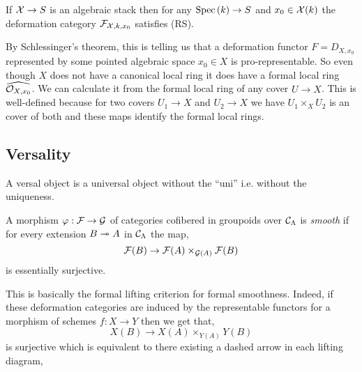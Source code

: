 \documentclass[12pt]{article}
\begin{document}
\begin{lemma}
If $\mathcal{X} \to S$ is an algebraic stack then for any $\mathrm{Spec}\left( k \right) \to S$ and $x_0 \in \mathcal{X}(k)$ the deformation category $\mathcal{F}_{\mathcal{X}, k, x_0}$ satisfies (RS). 
\end{lemma}

\begin{rmk}
By Schlessinger's theorem, this is telling us that a deformation functor $F = D_{X,x_0}$ represented by some pointed algebraic space $x_0 \in X$ is pro-representable. So even though $X$ does not have a canonical local ring it does have a formal local ring $\widehat{\mathcal{O}_{X, x_0}}$. We can calculate it from the formal local ring of any \etale cover $U \to X$. This is well-defined because for two \etale covers $U_1 \to X$ and $U_2 \to X$ we have $U_1 \times_X U_2$ is an \etale cover of both and these maps identify the formal local rings.
\end{rmk}

\subsection{Versality}

\begin{rmk}
A versal object is a universal object without the ``uni'' i.e. without the uniqueness. 
\end{rmk}

\begin{defn}
A morphism $\varphi : \mathcal{F} \to \mathcal{G}$ of categories cofibered in groupoids over $\mathcal{C}_\Lambda$ is \textit{smooth} if for every extension $B \twoheadrightarrow A$ in $\mathcal{C}_{\Lambda}$ the map,
\[ \mathcal{F}(B) \to \mathcal{F}(A) \times_{\mathcal{G}(A)} \mathcal{F}(B) \]
is essentially surjective.
\end{defn}

\begin{rmk}
This is basically the formal lifting criterion for formal smoothness. Indeed, if these deformation categories are induced by the representable functors for a morphism of schemes $f : X \to Y$ then we get that,
\[ X(B) \to X(A) \times_{Y(A)} Y(B) \]
is surjective which is equivalent to there existing a dashed arrow in each lifting diagram,
\begin{center}
\end{center} 
\end{rmk}
\end{document}
